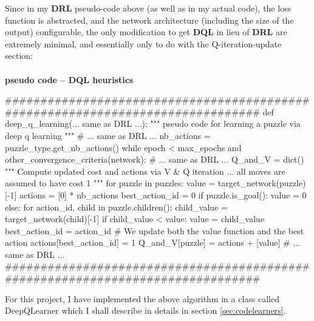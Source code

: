 Since in my \textbf{DRL} pseudo-code above (as well as in my actual code), the loss function is abstracted, and the network architecture (including the size of the output) configurable, the only modification to get \textbf{DQL} in lieu of \textbf{DRL} are extremely minimal, and essentially only to do with the Q-iteration-update section:


\teal
\paragraph{}{\textbf{pseudo code -- \textbf{DQL} heuristics}}
\begin{pseudocode}
###############################################################################
def deep_q_learning(... same as DRL ...):
    """ pseudo code for learning a puzzle via deep q learning """
    # ... same as DRL ...
    nb_actions = puzzle_type.get_nb_actions()
    while epoch < max_epochs and other_convergence_criteria(network):
        # ... same as DRL ...
        Q_and_V = dict()
        """ Compute updated cost and actions via V & Q iteration ... 
             all moves are assumed to have cost 1 """
        for puzzle in puzzles:
            value = target_network(puzzle)[-1]
            actions = [0] * nb_actions
            best_action_id = 0
            if puzzle.is_goal():
                value = 0
            else:
                for action_id, child in puzzle.children():
                    child_value = target_network(child)[-1]
                    if child_value < value:
                        value = child_value
                        best_action_id = action_id
            # We update both the value function and the best action
            actions[best_action_id] = 1
            Q_and_V[puzzle] = actions + [value]
        # ... same as DRL ...
###############################################################################
\end{pseudocode}
\black


For this project, I have implemented the above algorithm in a class called DeepQLearner which I shall describe in details in section \ref{sec:codelearners}.


\label{sec:TheoryMCTS}

